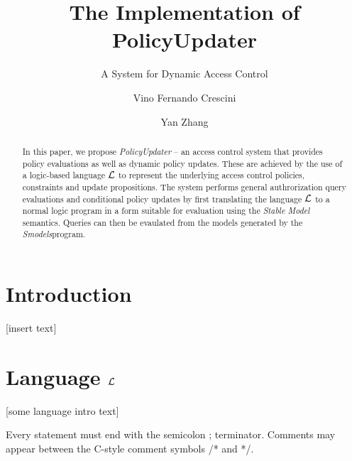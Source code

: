 \documentclass{llncs}
\begin{document}
  \long{}

  \title{The Implementation of PolicyUpdater}
  \subtitle{A System for Dynamic Access Control}

  \author{Vino Fernando Crescini \and Yan Zhang}


  \maketitle

  \begin{abstract}
    In this paper, we propose \emph{PolicyUpdater} -- an access control system
    that provides policy evaluations as well as dynamic policy updates.
    These are achieved by the use of a logic-based language $\cal{L}$ to
    represent the underlying access control policies, constraints and update
    propositions. The system performs general authrorization query evaluations
    and conditional policy updates by first translating the language $\cal{L}$
    to a normal logic program in a form suitable for evaluation using the
    \emph{Stable Model} semantics. Queries can then be evaulated from the
    models generated by the \emph{Smodels}\footnotemark program.

  \end{abstract}

  \section{Introduction}
    [insert text]

    \pagebreak

  \section{Language $\cal{L}$}

    [some language intro text]

    Every statement must end with the semicolon ; terminator. Comments
    may appear between the C-style comment symbols /* and */.
\end{document}

